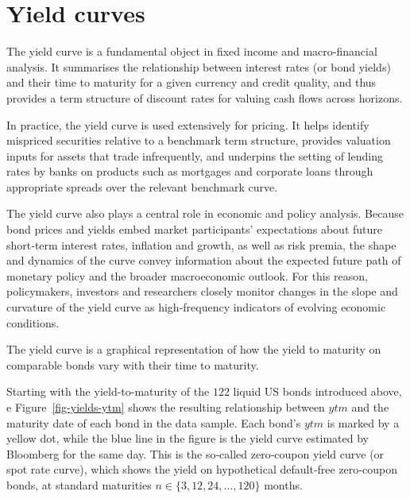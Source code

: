 \documentclass[
  letterpaper,
  DIV=11,
  numbers=noendperiod]{scrreprt}
\begin{document}
\section{Yield curves}\label{yield-curves}

The yield curve is a fundamental object in fixed income and
macro‑financial analysis. It summarises the relationship between
interest rates (or bond yields) and their time to maturity for a given
currency and credit quality, and thus provides a term structure of
discount rates for valuing cash flows across horizons.

In practice, the yield curve is used extensively for pricing. It helps
identify mispriced securities relative to a benchmark term structure,
provides valuation inputs for assets that trade infrequently, and
underpins the setting of lending rates by banks on products such as
mortgages and corporate loans through appropriate spreads over the
relevant benchmark curve.

The yield curve also plays a central role in economic and policy
analysis. Because bond prices and yields embed market participants'
expectations about future short‑term interest rates, inflation and
growth, as well as risk premia, the shape and dynamics of the curve
convey information about the expected future path of monetary policy and
the broader macroeconomic outlook. For this reason, policymakers,
investors and researchers closely monitor changes in the slope and
curvature of the yield curve as high‑frequency indicators of evolving
economic conditions.

\begin{tcolorbox}[enhanced jigsaw, arc=.35mm, bottomrule=.15mm, bottomtitle=1mm, breakable, colback=white, colbacktitle=quarto-callout-note-color!10!white, colframe=quarto-callout-note-color-frame, coltitle=black, left=2mm, leftrule=.75mm, opacityback=0, opacitybacktitle=0.6, rightrule=.15mm, title=\textcolor{quarto-callout-note-color}{\faInfo}\hspace{0.5em}{Note}, titlerule=0mm, toprule=.15mm, toptitle=1mm]

The yield curve is a graphical representation of how the yield to
maturity on comparable bonds vary with their time to maturity.

\end{tcolorbox}

Starting with the yield-to-maturity of the \(122\) liquid US bonds
introduced above, e Figure~\ref{fig-yields-ytm} shows the resulting
relationship between \(ytm\) and the maturity date of each bond in the
data sample. Each bond's \(ytm\) is marked by a yellow dot, while the
blue line in the figure is the yield curve estimated by Bloomberg for
the same day. This is the so‑called zero‑coupon yield curve (or spot
rate curve), which shows the yield on hypothetical default‑free
zero‑coupon bonds, at standard maturities \(n\in\{3,12,24,\ldots,120\}\)
months.
\end{document}
